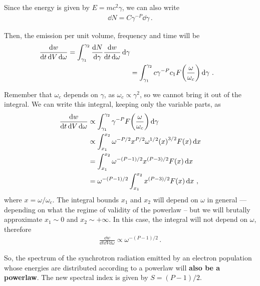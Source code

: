 \documentclass[main.tex]{subfiles}
\begin{document}
Since the energy is given by \(E = mc^2 \gamma \), we can also write 
%
\begin{align}
\dd{N} = C \gamma^{-P} \dd{\gamma }
\,.
\end{align}

Then, the emission per unit volume, frequency and time will be 
%
\begin{align}
\frac{ \dd{w}}{ \dd{t} \dd{V} \dd{\omega }} 
= \int_{\gamma_1 }^{\gamma_2 } \frac{ \dd{N}}{ \dd{\gamma }} \frac{ \dd{w}}{ \dd{t} \dd{\omega }}  \dd{\gamma }  \\
&= \int_{\gamma_1 }^{\gamma_2 } c \gamma^{-P } c_1 F \qty(\frac{\omega }{\omega _c}) \dd{\gamma }
\,.
\end{align}

Remember that \(\omega_c\) depends on \(\gamma \), as \(\omega _c \propto \gamma^{2}\), so we cannot bring it out of the integral. 
We can write this integral, keeping only the variable parts, as 
%
\begin{align}
\frac{ \dd{w}}{ \dd{t} \dd{V} \dd{\omega }} 
&\propto \int_{\gamma_1 }^{\gamma_2 } \gamma^{-P} F \qty(\frac{\omega }{\omega _c}) \dd{\gamma }  \\
&\propto \int_{x_1 }^{x_2 } \omega^{-P / 2} x^{P/2} \omega^{1/2} \qty(x)^{3/2} F \qty(x) \dd{ x}  \\
&= \int_{x_1 }^{x_2 } \omega^{-(P-1)/2} x^{(P-3) / 2} F \qty(x) \dd{x}   \\
&= \omega^{- (P-1 ) / 2} \int_{x_1 }^{x_2 } x^{(P-3) / 2} F(x) \dd{x}
\,,
\end{align}
%
where \(x = \omega / \omega _c\). 
The integral bounds \(x_1 \) and \(x_2 \) will depend on \(\omega \) in general --- depending on what the regime of validity of the powerlaw --  but we will brutally approximate \(x_1 \sim 0 \) and \(x_2 \sim + \infty \).
In this case, the integral will not depend on \(\omega \), therefore 
%
\begin{align}
\frac{ \dd{w}}{ \dd{t} \dd{V} \dd{\omega }} 
\propto \omega^{- (P-1) / 2}
\,.
\end{align}

So, the spectrum of the synchrotron radiation emitted by an electron population whose energies are distributed according to a powerlaw will \textbf{also be a powerlaw}.
The new spectral index is given by \(S = (P-1) / 2\). 
\end{document}
